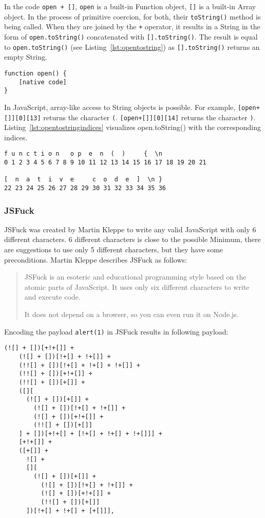 In the code \verb|open + []|, \verb|open| is a built-in Function object, \verb|[]| is a built-in Array object.
In the process of primitive coercion, for both, their \verb|toString()| method is being called.
When they are joined by the \verb|+| operator, it results in a String in the form of \verb|open.toString()| concatenated with \verb|[].toString()|. The result is equal to \verb|open.toString()| (see Listing~\ref{lst:opentostring}) as \verb|[].toString()| returns an empty String.

\begin{lstlisting}[style=basicStyle, caption=open.toString() in JavaScript, label={lst:opentostring}]
function open() {
    [native code]
}
\end{lstlisting}

In JavaScript, array-like access to String objects is possible. \cite{js/stringbrackets} For example, \verb|[open+[]][0][13]| returns the character \verb|(|. \verb|[open+[]][0][14]| returns the character \verb|)|. Listing~\ref{lst:opentostringindices} visualizes open.toString() with the corresponding indices.

\begin{lstlisting}[style=basicStyle, caption=open.toString() with indices in JavaScript, label={lst:opentostringindices}]
f u n c t i o n   o p  e  n  (  )     {  \n
0 1 2 3 4 5 6 7 8 9 10 11 12 13 14 15 16 17 18 19 20 21

[  n  a  t  i  v  e     c  o  d  e  ]  \n }
22 23 24 25 26 27 28 29 30 31 32 33 34 35 36
\end{lstlisting}


\subsubsection{JSFuck}
JSFuck was created by Martin Kleppe to write any valid JavaScript with only 6 different characters. 6 different characters is close to the possible Minimum, there are suggestions to use only 5 different characters, but they have some preconditions. \cite{mk/five, tc39/pipeline}
Martin Kleppe describes JSFuck as follows:
\begin{quote}
	JSFuck is an esoteric and educational programming style based on the atomic parts of JavaScript. It uses only six different characters to write and execute code.

	It does not depend on a browser, so you can even run it on Node.js. \cite{mk/jsfuck}
\end{quote}
Encoding the payload \verb|alert(1)| in JSFuck results in following payload:
\begin{lstlisting}[style=basicStyle, caption=alert(1) in JSFuck, label={lst:alert1jsfuck}]
  (![] + [])[+!+[]] +
    (![] + [])[!+[] + !+[]] +
    (!![] + [])[!+[] + !+[] + !+[]] +
    (!![] + [])[+!+[]] +
    (!![] + [])[+[]] +
    ([][
      (![] + [])[+[]] +
        (![] + [])[!+[] + !+[]] +
        (![] + [])[+!+[]] +
        (!![] + [])[+[]]
    ] + [])[+!+[] + [!+[] + !+[] + !+[]]] +
    [+!+[]] +
    ([+[]] +
      ![] +
      [][
        (![] + [])[+[]] +
          (![] + [])[!+[] + !+[]] +
          (![] + [])[+!+[]] +
          (!![] + [])[+[]]
      ])[!+[] + !+[] + [+[]]],
\end{lstlisting}

